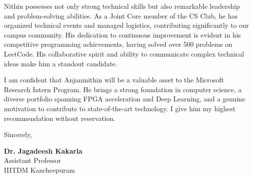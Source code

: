 \documentclass[11pt,a4paper]{article}
\begin{document}
Nithin possesses not only strong technical skills but also remarkable leadership and problem-solving abilities. As a Joint Core member of the CS Club, he has organized technical events and managed logistics, contributing significantly to our campus community. His dedication to continuous improvement is evident in his competitive programming achievements, having solved over 500 problems on LeetCode. His collaborative spirit and ability to communicate complex technical ideas make him a standout candidate.

I am confident that Anjaninithin will be a valuable asset to the Microsoft Research Intern Program. He brings a strong foundation in computer science, a diverse portfolio spanning FPGA acceleration and Deep Learning, and a genuine motivation to contribute to state-of-the-art technology. I give him my highest recommendation without reservation.

Sincerely,

\vspace{2cm}

\textbf{Dr. Jagadeesh Kakarla}\\
Assistant Professor\\
IIITDM Kancheepuram
\end{document}
